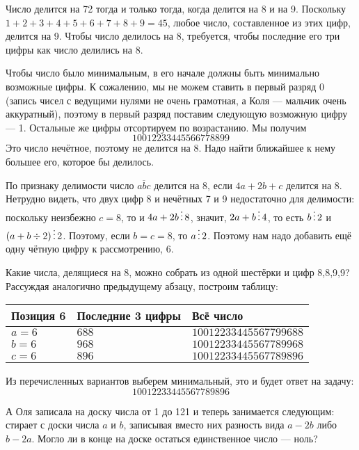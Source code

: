 \begin{itemize}
\itA Число делится на 72 тогда и только тогда, когда делится на 8 и на 9.
Поскольку $1+2+3+4+5+6+7+8+9 = 45$, любое число, составленное из этих цифр, делится на 9.
Чтобы число делилось на 8, требуется, чтобы последние его три цифры как число делились
на 8. 

Чтобы число было минимальным, в его начале должны быть минимально возможные цифры.
К сожалению, мы не можем ставить в первый разряд 0 (запись чисел с ведущими нулями не 
очень грамотная, а Коля --- мальчик очень аккуратный), поэтому в первый разряд поставим
следующую возможную цифру --- 1. Остальные же цифры отсортируем по возрастанию.
Мы получим $$10012233445566778899$$
Это число нечётное, поэтому не делится на 8.
Надо найти ближайшее к нему большее его, которое бы делилось.

По признаку
делимости число $\overline{abc}$ делится на 8, если $4a + 2b +c$ делится на 8.
Нетрудно видеть, что двух цифр 8 и нечётных 7 и 9 недостаточно для делимости:
поскольку неизбежно $c = 8$, то и $4a + 2b \mathop{\vdots} 8$, значит, $2a+b \mathop{\vdots} 4$, 
то есть $b \mathop{\vdots} 2$ и $(a + b \div 2) \mathop{\vdots} 2$. Поэтому, если $b = c = 8$,
то $a \mathop{\vdots} 2$. Поэтому нам надо добавить ещё одну чётную цифру к рассмотрению,
6.

Какие числа, делящиеся на 8, можно собрать из одной шестёрки и цифр 8,8,9,9? 
Рассуждая аналогично предыдущему абзацу, построим таблицу:

\begin{center}\begin{tabular}{lll}
Позиция 6 & Последние 3 цифры & Всё число\\
\hline
$a=6$ & $688$ & $10012233445567799688$\\
$b=6$ & $968$ & $10012233445567789968$\\
$c=6$ & $896$ & $10012233445567789896$
\end{tabular}\end{center}

Из перечисленных вариантов выберем минимальный, это и будет ответ на задачу:
$$10012233445567789896$$

\itB А Оля записала на доску числа от 1 до 121 и теперь занимается следующим: 
стирает с доски числа $a$ и $b$, записывая вместо них разность вида $a-2b$ либо $b-2a$. 
Могло ли в конце на доске остаться единственное число — ноль?



\end{itemize}
